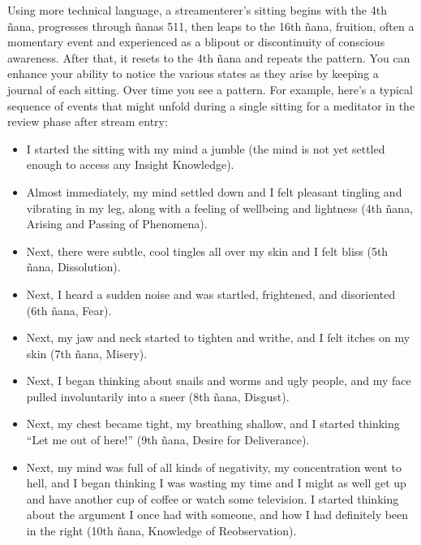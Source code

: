 \documentclass[a5paper,10pt,english]{book}
\begin{document}
\sphinxAtStartPar
Using more technical language, a stream\sphinxhyphen{}enterer’s sitting begins with
the 4th ñana, progresses through ñanas 5\sphinxhyphen{}11, then leaps to the 16th
ñana, fruition, often a momentary event and experienced as a blip\sphinxhyphen{}out or
discontinuity of conscious awareness. After that, it resets to the 4th
ñana and repeats the pattern. You can enhance your ability to notice the
various states as they arise by keeping a journal of each sitting. Over
time you see a pattern. For example, here’s a typical sequence of events
that might unfold during a single sitting for a meditator in the review
phase after stream entry:
\begin{itemize}
\item {} 
\sphinxAtStartPar
I started the sitting with my mind a jumble (the mind is not yet
settled enough to access any Insight Knowledge).

\item {} 
\sphinxAtStartPar
Almost immediately, my mind settled down and I felt pleasant tingling
and vibrating in my leg, along with a feeling of well\sphinxhyphen{}being and
lightness (4th ñana, Arising and Passing of Phenomena).

\item {} 
\sphinxAtStartPar
Next, there were subtle, cool tingles all over my skin and I felt
bliss (5th ñana, Dissolution).

\item {} 
\sphinxAtStartPar
Next, I heard a sudden noise and was startled, frightened, and
disoriented (6th ñana, Fear).

\item {} 
\sphinxAtStartPar
Next, my jaw and neck started to tighten and writhe, and I felt
itches on my skin (7th ñana, Misery).

\item {} 
\sphinxAtStartPar
Next, I began thinking about snails and worms and ugly people, and my
face pulled involuntarily into a sneer (8th ñana, Disgust).

\item {} 
\sphinxAtStartPar
Next, my chest became tight, my breathing shallow, and I started
thinking “Let me out of here!” (9th ñana, Desire for Deliverance).

\item {} 
\sphinxAtStartPar
Next, my mind was full of all kinds of negativity, my concentration
went to hell, and I began thinking I was wasting my time and I might
as well get up and have another cup of coffee or watch some
television. I started thinking about the argument I once had with
someone, and how I had definitely been in the right (10th ñana,
Knowledge of Re\sphinxhyphen{}observation).


\end{itemize}
\end{document}

